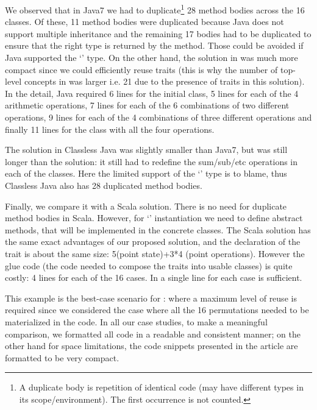 \noindent We observed that in Java7 we had to duplicate\footnote{A duplicate body is repetition of identical code (may have different types in its scope/environment). The first occurrence is not counted. } 28 method bodies across the 16 classes.
Of these, 11 method bodies were duplicated because Java does not support multiple inheritance
 and the remaining 17 bodies had to be duplicated to ensure that the right type
 is returned by the method. Those could be avoided if Java supported
 the `\Q@This@' type.
 On the other hand, the solution in \name was much more compact since we could efficiently
reuse traits (this is why the number of top-level concepts in \name was larger i.e. 21 due to the
 presence of traits in this solution).
In the detail, Java required 6 lines for the initial \Q@Point@ class,
5 lines for each of the 4 arithmetic operations, 7 lines for each of the 6 combinations
of two different operations, 9 lines for each of the 4 combinations of three different 
operations and finally 11 lines for the class with all the four operations.


 The solution in Classless Java was slightly smaller than Java7,
 but was still longer than the \name solution: it still had to redefine the
 sum/sub/etc operations in each of the classes. Here the limited
 support of the `\Q@This@' type is to blame, thus Classless Java also has 28 duplicated method bodies.

Finally, we compare it with a Scala solution.
There is no need for duplicate method bodies in Scala.
However, for `\Q@This@' instantiation we need to define abstract methods, that will be implemented in the concrete classes.
The Scala solution has the same exact advantages
of our proposed solution, and the declaration
of the trait is about the same size: 
5(point state)+3*4 (point operations).
However the glue code (the code needed to compose the traits into usable classes) is quite costly:
4 lines for each of the 16 cases.
In \name a single line for each case is sufficient.

This example is the best-case scenario for \name: where a maximum level of reuse
 is required since we considered the case where all the 16 permutations needed to be materialized in the code.
In all our case studies, to make a meaningful comparison, we formatted all code in a readable and consistent manner;
on the other hand for space limitations, the code snippets presented in the article
are formatted to be very compact.


